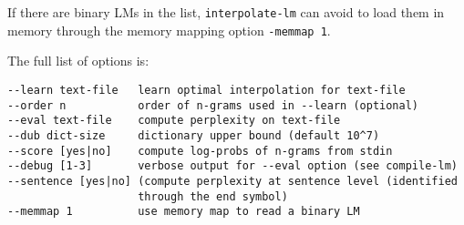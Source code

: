 \bigskip
\noindent
If there are binary LMs in the list,  {\tt interpolate-lm} can avoid to load them in memory through the memory 
mapping option {\tt -memmap 1}.


\noindent
The full list of options is:

\begin{verbatim}
--learn text-file   learn optimal interpolation for text-file
--order n           order of n-grams used in --learn (optional)
--eval text-file    compute perplexity on text-file
--dub dict-size     dictionary upper bound (default 10^7)
--score [yes|no]    compute log-probs of n-grams from stdin
--debug [1-3]       verbose output for --eval option (see compile-lm)
--sentence [yes|no] (compute perplexity at sentence level (identified
                    through the end symbol)
--memmap 1          use memory map to read a binary LM
\end{verbatim}
 


